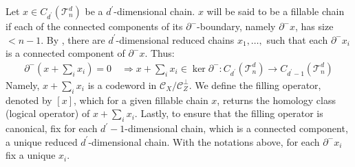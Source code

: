\begin{definition}
  \label{def:connsyn}
Let $x \in C_{d^{\prime}}(\mathcal{T}_n^d)$ be a $d^{\prime}$-dimensional chain. $x$ will be said to be a fillable chain if each of the connected components of its $\partial^{-}$-boundary, namely $\partial^{-} x$, has size $< n - 1$. By , there are $d^{\prime}$-dimensional reduced chains $x_{1}, \ldots,$ such that each $\partial^{-}x_{i}$ is a connected component of $\partial^{-}x$. Thus:
    \begin{equation*}
      \begin{split}
      \partial^{-} (x + \sum_{i}x_{i}) = 0  \quad \Rightarrow x + \sum_{i}x_{i} \in \ker \partial^{-} \colon C_{d^{\prime}}(\mathcal{T}_n^d) \rightarrow C_{d^{\prime}-1}(\mathcal{T}_n^d)
    \end{split}
  \end{equation*}
  Namely, $x + \sum_{i}x_{i}$ is a codeword in $\mathcal{C}_{X}/ \mathcal{C}_{Z}^{\perp}$. We define the filling operator, denoted by $[x]$, which for a given fillable chain $x$, returns the homology class (logical operator) of $x + \sum_{i}x_{i}$. Lastly, to ensure that the filling operator is canonical, fix for each $d^{\prime}-1$-dimensional chain, which is a connected component, a unique reduced $d^{\prime}$-dimensional chain. With the notations above, for each $\partial^{-} x_{i}$ fix a unique $x_{i}$.
\end{definition}


